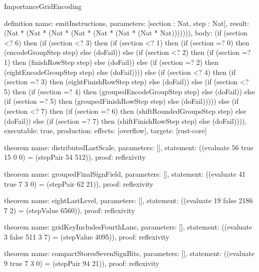 \begin{lexlean}{ImportanceGridEncoding}
\begin{semanticmodule}
definition{
  name: emitInstructions,
  parameters: [section : Nat, step : Nat],
  result: (Nat * (Nat * (Nat * (Nat * (Nat * (Nat * (Nat * Nat))))))),
  body: (if (section <? 6) then (if (section <? 3) then
      (if (section <? 1) then
      (if (section =? 0) then (encodeGroupStep step) else (doFail)) else
      (if (section <? 2) then
      (if (section =? 1) then (finishRowStep step) else (doFail)) else
      (if (section =? 2) then (eightEncodeGroupStep step) else (doFail)))) else
      (if (section <? 4) then
      (if (section =? 3) then (eightFinishRowStep step) else (doFail)) else
      (if (section <? 5) then
      (if (section =? 4) then (groupedEncodeGroupStep step) else (doFail)) else
      (if (section =? 5) then (groupedFinishRowStep step) else (doFail))))) else (if (section <? 7) then
      (if (section =? 6) then (shiftRoundedGroupsStep step) else (doFail)) else
      (if (section =? 7) then (shiftFinishRowStep step) else (doFail)))),
  executable: true,
  production: {effects: [overflow], targets: [rust-core]}
}

theorem{
  name: distributedLastScale,
  parameters: [],
  statement: ((evaluate 56 true 15 0 0) = (stepPair 54 512)),
  proof: reflexivity{}
}

theorem{
  name: groupedFinalSignField,
  parameters: [],
  statement: ((evaluate 41 true 7 3 0) = (stepPair 62 21)),
  proof: reflexivity{}
}

theorem{
  name: eightLastLevel,
  parameters: [],
  statement: ((evaluate 19 false 2186 7 2) = (stepValue 6560)),
  proof: reflexivity{}
}

theorem{
  name: gridKeyIncludesFourthLane,
  parameters: [],
  statement: ((evaluate 3 false 511 3 7) = (stepValue 4095)),
  proof: reflexivity{}
}

theorem{
  name: compactStoresSevenSignBits,
  parameters: [],
  statement: ((evaluate 9 true 7 3 0) = (stepPair 94 21)),
  proof: reflexivity{}
}
\end{semanticmodule}
\end{lexlean}
